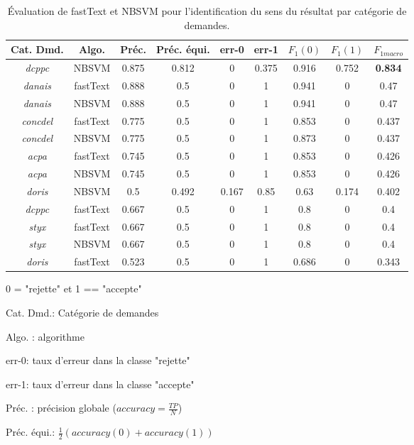  \begin{table}[htb]
 	\footnotesize 
 	\begin{center}
 	\begin{tabular}{|c|c|c|c|c|c|c|c|c|}
 		\hline
Cat. Dmd. & Algo. & {Préc.} & {Préc. équi.} & {err-0} & {err-1} & $F_1(0)$ & $F_1(1)$ & {$F_{1macro}$} \\ \hline
 	\textit{dcppc} & NBSVM & 0.875 & 0.812 & 0 & 0.375 & 0.916 & 0.752 & \textbf{0.834} \\ \hline
 	\textit{danais} & fastText & 0.888 & 0.5 & 0 & 1 & 0.941 & 0 & 0.47 \\ \hline
 	\textit{danais} & NBSVM & 0.888 & 0.5 & 0 & 1 & 0.941 & 0 & 0.47 \\ \hline
 	\textit{concdel} & fastText & 0.775 & 0.5 & 0 & 1 & 0.853 & 0 & 0.437 \\ \hline
 	\textit{concdel} & NBSVM & 0.775 & 0.5 & 0 & 1 & 0.873 & 0 & 0.437 \\ \hline
 	\textit{acpa} & fastText & 0.745 & 0.5 & 0 & 1 & 0.853 & 0 & 0.426 \\ \hline
 	\textit{acpa} & NBSVM & 0.745 & 0.5 & 0 & 1 & 0.853 & 0 & 0.426 \\ \hline
 	\textit{doris} & NBSVM & 0.5 & 0.492 & 0.167 & 0.85 & 0.63 & 0.174 & 0.402 \\ \hline
 	\textit{dcppc} & fastText & 0.667 & 0.5 & 0 & 1 & 0.8 & 0 & 0.4 \\ \hline
 	\textit{styx} & fastText & 0.667 & 0.5 & 0 & 1 & 0.8 & 0 & 0.4 \\ \hline
 	\textit{styx} & NBSVM & 0.667 & 0.5 & 0 & 1 & 0.8 & 0 & 0.4 \\ \hline
 	\textit{doris} & fastText & 0.523 & 0.5 & 0 & 1 & 0.686 & 0 & 0.343 \\ \hline
 	\end{tabular}
 \end{center}
 	
 0 = "rejette" et 1 == "accepte"
 
 Cat. Dmd.: Catégorie de demandes
 
 Algo. : algorithme
 
 err-0: taux d'erreur dans la classe "rejette"
 
 err-1: taux d'erreur dans la classe "accepte"
 
 Préc. : précision globale ($accuracy = \frac{TP}{N}$)
 
 Préc. équi.: $\frac{1}{2}(accuracy(0) + accuracy(1))$

\caption{Évaluation de fastText et NBSVM pour l'identification du sens du résultat par catégorie de demandes.}\label{tab:sensrst:fasttextnbsvm}
 \end{table}

